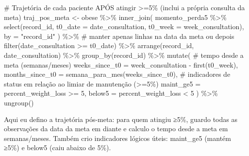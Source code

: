\documentclass[
]{article}
\newenvironment{Shaded}{\begin{snugshade}}{\end{snugshade}}
\newcommand{\AttributeTok}[1]{\textcolor[rgb]{0.40,0.45,0.13}{#1}}
\newcommand{\CommentTok}[1]{\textcolor[rgb]{0.37,0.37,0.37}{#1}}
\newcommand{\DecValTok}[1]{\textcolor[rgb]{0.68,0.00,0.00}{#1}}
\newcommand{\FunctionTok}[1]{\textcolor[rgb]{0.28,0.35,0.67}{#1}}
\newcommand{\NormalTok}[1]{\textcolor[rgb]{0.00,0.23,0.31}{#1}}
\newcommand{\OtherTok}[1]{\textcolor[rgb]{0.00,0.23,0.31}{#1}}
\newcommand{\SpecialCharTok}[1]{\textcolor[rgb]{0.37,0.37,0.37}{#1}}
\newcommand{\StringTok}[1]{\textcolor[rgb]{0.13,0.47,0.30}{#1}}
\begin{document}
\begin{Shaded}
\begin{Highlighting}[]
\CommentTok{\# Trajetória de cada paciente APÓS atingir \textgreater{}=5\% (inclui a própria consulta da meta)}
\NormalTok{traj\_pos\_meta }\OtherTok{\textless{}{-}}\NormalTok{ obese }\SpecialCharTok{\%\textgreater{}\%}
  \FunctionTok{inner\_join}\NormalTok{(}
\NormalTok{    momento\_perda5 }\SpecialCharTok{\%\textgreater{}\%}
      \FunctionTok{select}\NormalTok{(record\_id, }\AttributeTok{t0\_date =}\NormalTok{ date\_consultation, }\AttributeTok{t0\_week =}\NormalTok{ week\_consultation),}
    \AttributeTok{by =} \StringTok{"record\_id"}
\NormalTok{  ) }\SpecialCharTok{\%\textgreater{}\%}
  \CommentTok{\# manter apenas linhas na data da meta ou depois}
  \FunctionTok{filter}\NormalTok{(date\_consultation }\SpecialCharTok{\textgreater{}=}\NormalTok{ t0\_date) }\SpecialCharTok{\%\textgreater{}\%}
  \FunctionTok{arrange}\NormalTok{(record\_id, date\_consultation) }\SpecialCharTok{\%\textgreater{}\%}
  \FunctionTok{group\_by}\NormalTok{(record\_id) }\SpecialCharTok{\%\textgreater{}\%}
  \FunctionTok{mutate}\NormalTok{(}
    \CommentTok{\# tempo desde a meta (semanas/meses)}
    \AttributeTok{weeks\_since\_t0 =}\NormalTok{ week\_consultation }\SpecialCharTok{{-}} \FunctionTok{first}\NormalTok{(t0\_week),}
    \AttributeTok{months\_since\_t0 =} \FunctionTok{semana\_para\_mes}\NormalTok{(weeks\_since\_t0),}
    \CommentTok{\# indicadores de status em relação ao limiar de manutenção (\textgreater{}=5\%)}
    \AttributeTok{maint\_ge5 =}\NormalTok{ percent\_weight\_loss }\SpecialCharTok{\textgreater{}=} \DecValTok{5}\NormalTok{,}
    \AttributeTok{below5    =}\NormalTok{ percent\_weight\_loss }\SpecialCharTok{\textless{}} \DecValTok{5}
\NormalTok{  ) }\SpecialCharTok{\%\textgreater{}\%}
  \FunctionTok{ungroup}\NormalTok{()}
\end{Highlighting}
\end{Shaded}

Aqui eu defino a trajetória pós-meta: para quem atingiu ≥5\%, guardo
todas as observações da data da meta em diante e calculo o tempo desde a
meta em semanas/meses. Também crio indicadores lógicos úteis: maint\_ge5
(mantém ≥5\%) e below5 (caiu abaixo de 5\%).
\end{document}
